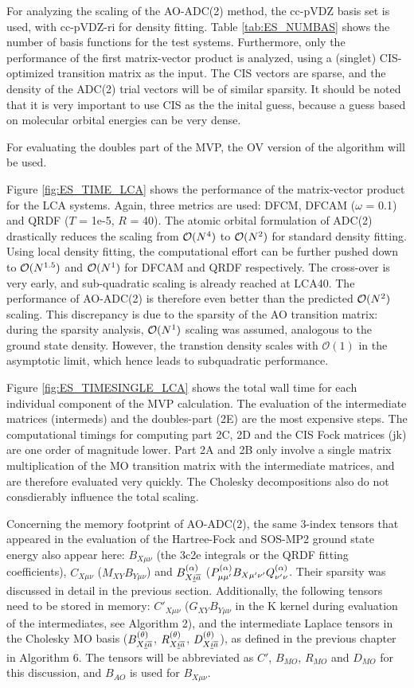 For analyzing the scaling of the AO-ADC(2) method, the cc-pVDZ basis set is used, with cc-pVDZ-ri for density fitting. Table \ref{tab:ES_NUMBAS} shows the number of basis functions for the test systems. Furthermore, only the performance of the first matrix-vector product is analyzed, using a (singlet) CIS-optimized transition matrix as the input. The CIS vectors are sparse, and the density of the ADC(2) trial vectors will be of similar sparsity. It should be noted that it is very important to use CIS as the the inital guess, because a guess based on molecular orbital energies can be very dense. 

For evaluating the doubles part of the MVP, the OV version of the algorithm will be used.

Figure \ref{fig:ES_TIME_LCA} shows the performance of the matrix-vector product for the LCA systems. Again, three metrics are used: DFCM, DFCAM ($\omega$ = 0.1) and QRDF ($T$ = 1e-5, $R$ = 40). The atomic orbital formulation of ADC(2) drastically reduces the scaling from $\mathcal{O}(N^{4})$ to $\mathcal{O}(N^{2})$ for standard density fitting. Using local density fitting, the computational effort can be further pushed down to $\mathcal{O}(N^{1.5})$ and $\mathcal{O}(N^{1})$ for DFCAM and QRDF respectively. The cross-over is very early, and sub-quadratic scaling is already reached at LCA40. The performance of AO-ADC(2) is therefore even better than the predicted $\mathcal{O}(N^{2})$ scaling. This discrepancy is due to the sparsity of the AO transition matrix: during the sparsity analysis, $\mathcal{O}(N^{1})$ scaling was assumed, analogous to the ground state density. However, the transtion density scales with $\mathcal{O}(1)$ in the asymptotic limit, which hence leads to subquadratic performance.

Figure \ref{fig:ES_TIMESINGLE_LCA} shows the total wall time for each individual component of the MVP calculation. The evaluation of the intermediate matrices (intermeds) and the doubles-part (2E) are the most expensive steps. The computational timings for computing part 2C, 2D and the CIS Fock matrices (jk) are one order of magnitude lower. Part 2A and 2B only involve a single matrix multiplication of the MO transition matrix with the intermediate matrices, and are therefore evaluated very quickly. The Cholesky decompositions also do not consdierably influence the total scaling. 

Concerning the memory footprint of AO-ADC(2), the same 3-index tensors that appeared in the evaluation of the Hartree-Fock and SOS-MP2 ground state energy also appear here: $B_{X\mu\nu}$ (the 3c2e integrals or the QRDF fitting coefficients), $C_{X\mu\nu}$ ($M_{XY}B_{Y\mu\nu}$) and $B^{(\alpha)}_{X\underline{i}\overline{a}}$ ($P^{(\alpha)}_{\mu\mu'} B_{X\mu'\nu'} Q^{(\alpha)}_{\nu'\nu}$. Their sparsity was discussed in detail in the previous section. Additionally, the following tensors need to be stored in memory: $C'_{X\mu\nu}$ ($G_{XY}B_{Y\mu\nu}$ in the K kernel during evaluation of the intermediates, see Algorithm 2), and the intermediate Laplace tensors in the Cholesky MO basis ($B^{(\theta)}_{X\underline{i}\overline{a}}$, $R^{(\theta)}_{X\underline{i}\overline{a}}$, $D^{(\theta)}_{X\underline{i}\overline{a}}$), as defined in the previous chapter in Algorithm 6. The tensors will be abbreviated as $C'$, $B_{MO}$, $R_{MO}$ and $D_{MO}$ for this discussion, and $B_{AO}$ is used for $B_{X\mu\nu}$.

